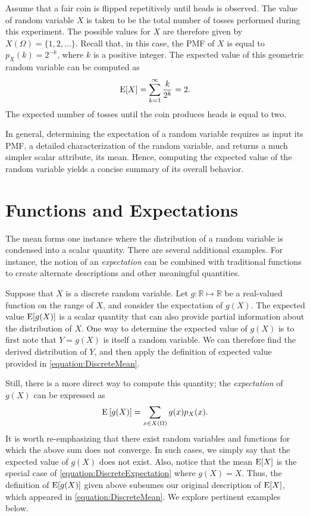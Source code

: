\begin{example}
Assume that a fair coin is flipped repetitively until heads is observed.
The value of random variable $X$ is taken to be the total number of tosses performed during this experiment.
The possible values for $X$ are therefore given by $X (\Omega) = \{ 1, 2, \ldots \}$.
Recall that, in this case, the PMF of $X$ is equal to $p_X(k) = 2^{-k}$, where $k$ is a positive integer.
The expected value of this geometric random variable can be computed as
\begin{equation*}
\mathrm{E} [X] = \sum_{k=1}^{\infty} \frac{k}{2^k}
= 2.
\end{equation*}
The expected number of tosses until the coin produces heads is equal to two.
\end{example}

In general, determining the expectation of a random variable requires as input its PMF, a detailed characterization of the random variable, and returns a much simpler scalar attribute, its mean.
Hence, computing the expected value of the random variable yields a concise summary of its overall behavior.


\section{Functions and Expectations}

The mean forms one instance where the distribution of a random variable is condensed into a scalar quantity.
There are several additional examples.
For instance, the notion of an \emph{expectation} can be combined with traditional functions to create alternate descriptions and other meaningful quantities. 

Suppose that $X$ is a discrete random variable.
Let $g: \mathbb{R} \mapsto \mathbb{R}$ be a real-valued function on the range of $X$, and consider the expectation of $g(X)$.
The expected value $\mathrm{E} [g(X)]$ is a scalar quantity that can also provide partial information about the distribution of $X$.
One way to determine the expected value of $g(X)$ is to first note that $Y = g(X)$ is itself a random variable.
We can therefore find the derived distribution of $Y$, and then apply the definition of expected value provided in \eqref{equation:DiscreteMean}.

Still, there is a more direct way to compute this quantity;
the \emph{expectation} of $g(X)$ can be expressed as 
\begin{equation} \label{equation:DiscreteExpectation}
\mathrm{E} \left[ g(X) \right]
= \sum_{x \in X(\Omega)} g(x) p_X (x) .
\end{equation}
It is worth re-emphasizing that there exist random variables and functions for which the above sum does not converge.
In such cases, we simply say that the expected value of $g(X)$ does not exist.
Also, notice that the mean $\mathrm{E} [X]$ is the special case of \eqref{equation:DiscreteExpectation} where $g(X) = X$.
Thus, the definition of $\mathrm{E} [g(X)]$ given above subsumes our original description of $\mathrm{E} [X]$, which appeared in \eqref{equation:DiscreteMean}.
We explore pertinent examples below.

